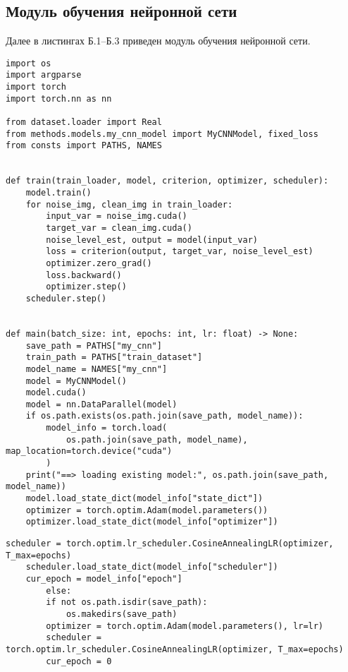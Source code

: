 \begin{appendices}
\clearpage

\chapter{Модуль обучения нейронной сети}

Далее в листингах Б.1--Б.3 приведен модуль обучения нейронной сети.

\begin{lstlisting}[caption={Модуль обучения нейронной сети (часть 1)}]
import os
import argparse
import torch
import torch.nn as nn

from dataset.loader import Real
from methods.models.my_cnn_model import MyCNNModel, fixed_loss
from consts import PATHS, NAMES


def train(train_loader, model, criterion, optimizer, scheduler):
    model.train()
    for noise_img, clean_img in train_loader:
        input_var = noise_img.cuda()
        target_var = clean_img.cuda()
        noise_level_est, output = model(input_var)
        loss = criterion(output, target_var, noise_level_est)
        optimizer.zero_grad()
        loss.backward()
        optimizer.step()
    scheduler.step()


def main(batch_size: int, epochs: int, lr: float) -> None:
    save_path = PATHS["my_cnn"]
    train_path = PATHS["train_dataset"]
    model_name = NAMES["my_cnn"]
    model = MyCNNModel()
    model.cuda()
    model = nn.DataParallel(model)
    if os.path.exists(os.path.join(save_path, model_name)):
        model_info = torch.load(
            os.path.join(save_path, model_name), map_location=torch.device("cuda")
        )
    print("==> loading existing model:", os.path.join(save_path, model_name))
    model.load_state_dict(model_info["state_dict"])
    optimizer = torch.optim.Adam(model.parameters())
    optimizer.load_state_dict(model_info["optimizer"])

\end{lstlisting}
\clearpage

\begin{lstlisting}[caption={Модуль обучения нейронной сети (часть 2)}]
	scheduler = torch.optim.lr_scheduler.CosineAnnealingLR(optimizer, T_max=epochs)
    scheduler.load_state_dict(model_info["scheduler"])
    cur_epoch = model_info["epoch"]
        else:
        if not os.path.isdir(save_path):
            os.makedirs(save_path)
        optimizer = torch.optim.Adam(model.parameters(), lr=lr)
        scheduler = torch.optim.lr_scheduler.CosineAnnealingLR(optimizer, T_max=epochs)
        cur_epoch = 0


\end{lstlisting}
\end{appendices}
